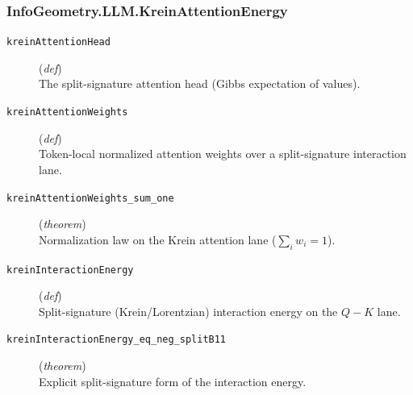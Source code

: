 \documentclass[11pt,a4paper]{article}
\begin{document}
\subsubsection*{InfoGeometry.LLM.KreinAttentionEnergy}
\begin{description}
  \item[\texttt{kreinAttentionHead}] (\textit{def}) \\ The split-signature attention head (Gibbs expectation of values).
  \item[\texttt{kreinAttentionWeights}] (\textit{def}) \\ Token-local normalized attention weights over a split-signature interaction lane.
  \item[\texttt{kreinAttentionWeights\_sum\_one}] (\textit{theorem}) \\ Normalization law on the Krein attention lane ($\sum _i  w_i  = 1$).
  \item[\texttt{kreinInteractionEnergy}] (\textit{def}) \\ Split-signature (Krein/Lorentzian) interaction energy on the $Q-K$ lane.
  \item[\texttt{kreinInteractionEnergy\_eq\_neg\_splitB11}] (\textit{theorem}) \\ Explicit split-signature form of the interaction energy.
\end{description}
\end{document}
